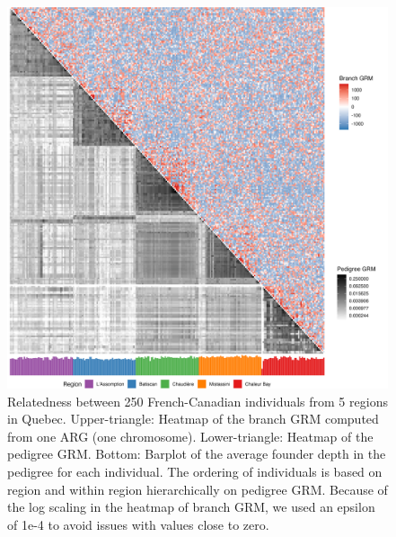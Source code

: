\begin{figure}
    \centering
    \includegraphics[width=\textwidth]{Figures/Fig4_grm_prm_heatmaps4.jpg}
    \caption{Relatedness between 250 French-Canadian individuals from 5 regions in Quebec.
      Upper-triangle: Heatmap of the branch GRM computed from one ARG (one chromosome).
      Lower-triangle: Heatmap of the pedigree GRM. 
      Bottom: Barplot of the average founder depth in the pedigree for each individual.
      The ordering of individuals is based on region and within region hierarchically on pedigree GRM.
      Because of the log scaling in the heatmap of branch GRM, we used an epsilon of 1e-4 to avoid issues with values close to zero.
    }
    \label{fig:grm_heatmap}
\end{figure}


